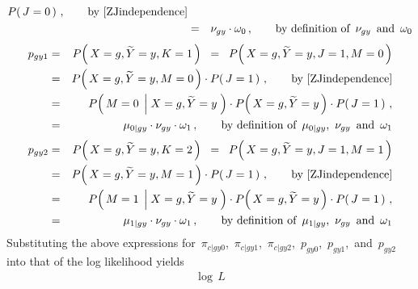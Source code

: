 \begin{enumerate}
\begin{eqnarray*}
	P\!\left(\,J=0\,\right)\,,
	\quad\quad
	\textnormal{by \eqref{ZJindependence}}
\\
&=&
	\nu_{gy}
	\cdot
	\omega_{0}\,,
	\quad\quad
	\textnormal{by definition of \,$\nu_{gy}$\, and \,$\omega_{0}$}
\end{eqnarray*}
\begin{eqnarray*}
p_{gy1}
&=&
	P\!\left(\,X=g,\widetilde{Y}=y,K=1\,\right)
\;\;=\;\;
	P\!\left(\,X=g,\widetilde{Y}=y,J=1,M=0\,\right)
\\
&=&
	P\!\left(\,X=g,\widetilde{Y}=y,M=0\,\right)
	\cdot
	P\!\left(\,J=1\,\right)\,,
	\quad\quad
	\textnormal{by \eqref{ZJindependence}}
\\
&=&
	P\!\left(\,M=0\;\left\vert\;X=g,\widetilde{Y}=y\right.\,\right)
	\cdot
	P\!\left(\,X=g,\widetilde{Y}=y\,\right)
	\cdot
	P\!\left(\,J=1\,\right)\,,
\\
&=&
	\mu_{0 \vert gy}
	\cdot
	\nu_{gy}
	\cdot
	\omega_{1}\,,
	\quad\quad
	\textnormal{by definition of \,$\mu_{0 \vert gy}$, \,$\nu_{gy}$\, and \,$\omega_{1}$}
\end{eqnarray*}
\begin{eqnarray*}
p_{gy2}
&=&
	P\!\left(\,X=g,\widetilde{Y}=y,K=2\,\right)
\;\;=\;\;
	P\!\left(\,X=g,\widetilde{Y}=y,J=1,M=1\,\right)
\\
&=&
	P\!\left(\,X=g,\widetilde{Y}=y,M=1\,\right)
	\cdot
	P\!\left(\,J=1\,\right)\,,
	\quad\quad
	\textnormal{by \eqref{ZJindependence}}
\\
&=&
	P\!\left(\,M=1\;\left\vert\;X=g,\widetilde{Y}=y\right.\,\right)
	\cdot
	P\!\left(\,X=g,\widetilde{Y}=y\,\right)
	\cdot
	P\!\left(\,J=1\,\right)\,,
\\
&=&
	\mu_{1 \vert gy}
	\cdot
	\nu_{gy}
	\cdot
	\omega_{1}\,,
	\quad\quad
	\textnormal{by definition of \,$\mu_{1 \vert gy}$, \,$\nu_{gy}$\, and \,$\omega_{1}$}
\end{eqnarray*}
Substituting the above expressions for
\,$\pi_{c \vert gy0}$,
\,$\pi_{c \vert gy1}$,
\,$\pi_{c \vert gy2}$,
\,$p_{gy0}$,
\,$p_{gy1}$,
\,and
\,$p_{gy2}$
\,into that of the log likelihood yields
\begin{eqnarray*}
\log\,L

\end{eqnarray*}
\end{enumerate}
